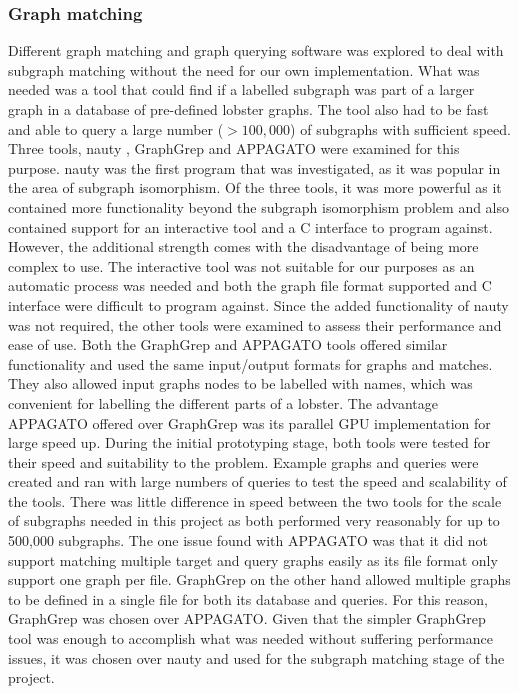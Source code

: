 \subsubsection{Graph matching}
Different graph matching and graph querying software was explored to deal with subgraph matching without the need for our own implementation. What was needed was a tool that could find if a labelled subgraph was part of a larger graph in a database of pre-defined lobster graphs. The tool also had to be fast and able to query a large number ($> 100,000$) of subgraphs with sufficient speed. Three tools, nauty \cite{nauty}, GraphGrep \cite{graphgrep} and APPAGATO \cite{appagato} were examined for this purpose. 
\n
nauty was the first program that was investigated, as it was popular in the area of subgraph isomorphism. Of the three tools, it was more powerful as it contained more functionality beyond the subgraph isomorphism problem and also contained support for an interactive tool and a C interface to program against. However, the additional strength comes with the disadvantage of being more complex to use. The interactive tool was not suitable for our purposes as an automatic process was needed and both the graph file format supported and C interface were difficult to program against. Since the added functionality of nauty was not required, the other tools were examined to assess their performance and ease of use.
\n
Both the GraphGrep and APPAGATO tools offered similar functionality and used the same input/output formats for graphs and matches. They also allowed input graphs nodes to be labelled with names, which was convenient for labelling the different parts of a lobster. The advantage APPAGATO offered over GraphGrep was its parallel GPU implementation for large speed up. During the initial prototyping stage, both tools were tested for their speed and suitability to the problem. Example graphs and queries were created and ran with large numbers of queries to test the speed and scalability of the tools. There was little difference in speed between the two tools for the scale of subgraphs needed in this project as both performed very reasonably for up to 500,000 subgraphs. The one issue found with APPAGATO was that it did not support matching multiple target and query graphs easily as its file format only support one graph per file. GraphGrep on the other hand allowed multiple graphs to be defined in a single file for both its database and queries. For this reason, GraphGrep was chosen over APPAGATO. 
\n
Given that the simpler GraphGrep tool was enough to accomplish what was needed without suffering performance issues, it was chosen over nauty and used for the subgraph matching stage of the project.

